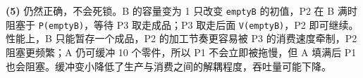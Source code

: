 \begin{enumerate}[resume]
\textbf{(5)} 仍然正确，不会死锁。B 的容量变为 1 只改变 \texttt{emptyB} 的初值，P2 在 B 满时阻塞于 \texttt{P(emptyB)}，等待 P3 取走成品；P3 取走后面 \texttt{V(emptyB)}，P2 即可继续。性能上，B 只能暂存一个成品，P2 的加工节奏更容易被 P3 的消费速度牵制，P2 阻塞更频繁；A 仍可缓冲 10 个零件，所以 P1 不会立即被拖慢，但 A 填满后 P1 也会阻塞。缓冲变小降低了生产与消费之间的解耦程度，吞吐量可能下降。
\par\noindent{}\else \answerarea[18] \fi

\end{enumerate}
